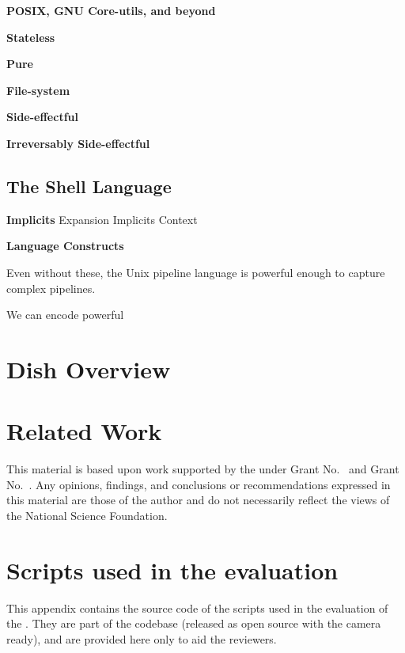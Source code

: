 \documentclass[sigplan,10pt,review,anonymous]{acmart}
\newcommand{\heading}[1]{\vspace{4pt}\noindent\textbf{#1}\enspace}
\begin{document}
\heading{POSIX, GNU Core-utils, and beyond}

\heading{Stateless}

\heading{Pure}

\heading{File-system}

\heading{Side-effectful}

\heading{Irreversably Side-effectful}

\subsection{The Shell Language}
\label{bg:shell}

\heading{Implicits}
Expansion
Implicits
Context

\heading{Language Constructs}

Even without these, the Unix pipeline language is powerful enough to capture complex pipelines.

We can encode powerful

\section{Dish Overview}

\section{Related Work}

\begin{acks}
  This material is based upon work supported by the
   under Grant
  No.~ and Grant
  No.~.  Any opinions, findings, and
  conclusions or recommendations expressed in this material are those
  of the author and do not necessarily reflect the views of the
  National Science Foundation.
\end{acks}





\appendix
\section{Scripts used in the evaluation}

This appendix contains the source code of the scripts used in the evaluation of
the \sys. They are part of the codebase (released as open source with the camera
ready), and are provided here only to aid the reviewers.
\end{document}
